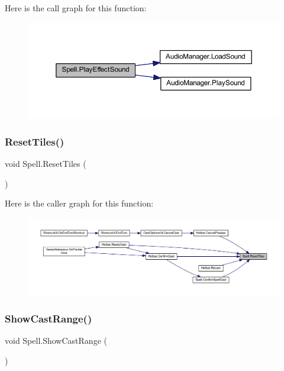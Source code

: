 Here is the call graph for this function\+:
\nopagebreak
\begin{figure}[H]
\begin{center}
\leavevmode
\includegraphics[width=350pt]{class_spell_a1dfbc90153df551bd995b8b852f808f0_cgraph}
\end{center}
\end{figure}
\mbox{\label{class_spell_a267e0b312732b826127c2d58ba64d90d}} 
\subsubsection{\texorpdfstring{ResetTiles()}{ResetTiles()}}
{\footnotesize\ttfamily void Spell.\+Reset\+Tiles (\begin{DoxyParamCaption}{ }\end{DoxyParamCaption})}

Here is the caller graph for this function\+:
\nopagebreak
\begin{figure}[H]
\begin{center}
\leavevmode
\includegraphics[width=350pt]{class_spell_a267e0b312732b826127c2d58ba64d90d_icgraph}
\end{center}
\end{figure}
\mbox{\label{class_spell_ad49f8d3af9c5a885120ca85b510eae75}} 
\subsubsection{\texorpdfstring{ShowCastRange()}{ShowCastRange()}}
{\footnotesize\ttfamily void Spell.\+Show\+Cast\+Range (\begin{DoxyParamCaption}{ }\end{DoxyParamCaption})}


